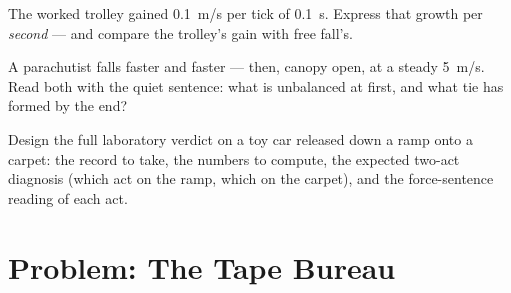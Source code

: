 \begin{exercise}[$\star\star$]\label{exo:g9:uniform-varied-motion:10}
The worked trolley gained \qty{0.1}{m/s} per tick of
\qty{0.1}{s}. Express that growth per \emph{second} --- and
compare the trolley's gain with free fall's.
\end{exercise}

\begin{exercise}[$\star\star$]\label{exo:g9:uniform-varied-motion:11}
A parachutist falls faster and faster --- then, canopy
open, at a steady \qty{5}{m/s}. Read both  with the
quiet sentence: what is unbalanced at first, and what tie
has formed by the end?
\end{exercise}

\begin{exercise}[$\star\star\star$]\label{exo:g9:uniform-varied-motion:12}
Design the full laboratory verdict on a toy car released
down a ramp onto a carpet: the record to take, the numbers
to compute, the expected two-act diagnosis (which act on
the ramp, which on the carpet), and the force-sentence
reading of each act.
\end{exercise}

\section{Problem: The Tape Bureau}

